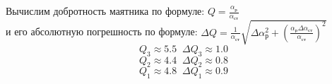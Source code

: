 \documentclass[a4paper]{article}
\begin{document}
		Вычислим добротность маятника по формуле:
		$Q = \frac{\alpha_\text{р}}{\alpha_\text{ст}}$\\
		
		и его абсолютную погрешность по формуле: $\displaystyle \Delta Q = \frac{1}{\alpha_\text{ст}}\sqrt{\Delta \alpha_\text{р}^2 + \left(\frac{\alpha_\text{р}\Delta\alpha_\text{ст}}{\alpha_\text{ст}}\right)^2}$
		$$
		Q_3 \approx 5.5 \;\; \Delta Q_3 \approx 1.0
		$$
		$$
		Q_2 \approx 4.4 \;\; \Delta Q_2 \approx 0.8
		$$
		$$
		Q_1 \approx 4.8 \;\; \Delta Q_1 \approx 0.9
		$$
		
	
\end{document}
